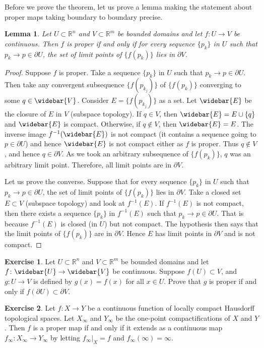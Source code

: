 \documentclass[12pt,openany]{book}
\newcommand{\R}{{\mathbb{R}}}
\theoremstyle{plain}
\newtheorem{lemma}[thm]{Lemma}
\theoremstyle{remark}
\theoremstyle{definition}
\newenvironment{exbox}{%
    \def\FrameCommand{\vrule width 1pt \relax\hspace{10pt}}%
    \MakeFramed {\advance \hsize -\width \FrameRestore}%
}{%
    \endMakeFramed
}
\theoremstyle{exercise}
\newtheorem{exercise}{Exercise}[section]
\theoremstyle{example}
\begin{document}
Before we prove the theorem, let us prove a lemma making the statement about
proper maps taking boundary to boundary precise.

\begin{lemma} \label{lemma:bndrytobndry}
Let $U \subset \R^n$ and $V \subset \R^m$ be bounded domains and
let $f \colon U \to V$ be continuous.
Then $f$ is proper if and only if
for every sequence $\{ p_k \}$ in $U$ such that $p_k \to p \in \partial U$,
the set of limit points of $\bigl\{ f(p_k) \bigr\}$ lies in $\partial V$.
\end{lemma}

\begin{proof}
Suppose $f$ is proper.  Take a 
sequence $\{ p_k \}$ in $U$ such that $p_k \to p \in \partial U$.
Then take any convergent subsequence $\bigl\{ f(p_{k_j}) \bigr\}$ of
$\bigl\{ f(p_k) \bigr\}$
converging to some $q \in \widebar{V}$.  Consider
$E = \bigl\{ f(p_{k_j}) \bigr\}$ as a set.  Let $\widebar{E}$ be the closure of $E$
in $V$ (subspace topology).  If $q \in V$, then $\widebar{E} = E \cup \{ q
\}$ and $\widebar{E}$ is compact.
Otherwise, if $q \notin V$, then
$\widebar{E} = E$.
The inverse image $f^{-1}(\widebar{E})$
is not compact (it contains a sequence going to $p \in \partial U$)
and hence $\widebar{E}$ is not
compact either as $f$ is proper.  Thus $q \notin V$, and hence $q \in
\partial V$.  As we took an arbitrary subsequence of $\bigl\{ f(p_k) \bigr\}$, $q$ was
an arbitrary limit point.  Therefore, all limit points are in $\partial V$.

Let us prove the converse.
Suppose that for every sequence
$\{ p_k \}$ in $U$ such that $p_k \to p \in \partial U$,
the set of limit points of $\bigl\{ f(p_k) \bigr\}$ lies in $\partial V$.
Take a closed set $E \subset V$ (subspace topology) and look at $f^{-1}(E)$.  If $f^{-1}(E)$
is not compact, then there exists a sequence $\{ p_k \}$ in $f^{-1}(E)$
such that $p_k \to p \in \partial U$.  That is because $f^{-1}(E)$ is closed
(in $U$) but not compact.  The hypothesis then says that the limit points of
$\bigl\{ f(p_k) \bigr\}$ are in $\partial V$.  Hence $E$ has limit points in
$\partial V$ and is not compact.
\end{proof}

\begin{exbox}
\begin{exercise}
Let $U \subset \R^n$ and $V \subset \R^m$ be bounded domains and
let $f \colon \widebar{U} \to \widebar{V}$ be continuous.
Suppose $f(U) \subset V$, and $g \colon U \to V$ is defined by
$g(x) = f(x)$ for all $x \in U$.
Prove that $g$ is proper if and only if $f(\partial U) \subset \partial V$.
\end{exercise}

\begin{exercise}
Let $f \colon X \to Y$ be a continuous function of locally compact Hausdorff topological spaces.
Let $X_\infty$ and $Y_\infty$ be the 
one-point compactifications of $X$ and $Y$.
Then $f$ is a proper map if and only if it extends as a continuous map
$f_\infty \colon X_\infty \to Y_\infty$ by letting
$f_\infty |_X = f$ and
 $f_\infty(\infty) = \infty$.
\end{exercise}
\end{exbox}
\end{document}
